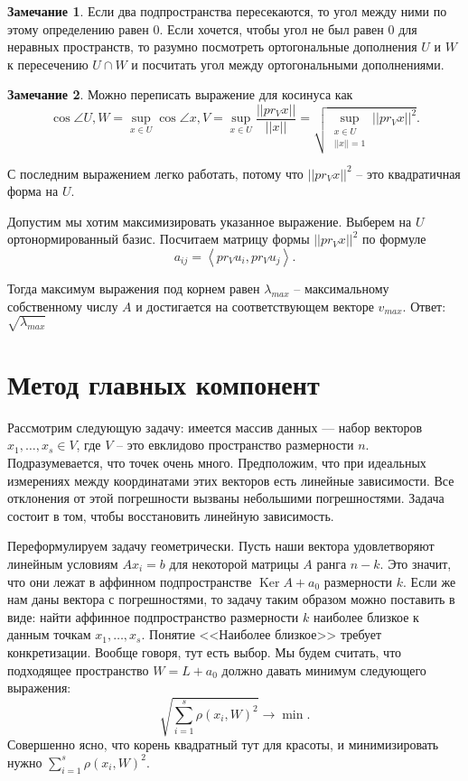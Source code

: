 \documentclass[10pt,a4paper,oneside]{book}
\theoremstyle{definition}
\newtheorem*{rem}{Замечание}
\DeclareMathOperator{\Ker}{Ker}
\def\lan{\left\langle }
\def\ran{\right\rangle}
\def\rm{\begin{rem}}
\def\erm{\end{rem}}
\begin{document}
\rm Если два подпространства пересекаются, то угол между ними по этому определению равен 0. Если хочется, чтобы угол не был равен 0 для неравных пространств, то разумно посмотреть ортогональные дополнения $U$ и $W$ к пересечению $U\cap W$ и посчитать угол между ортогональными дополнениями. 
\erm

\rm Можно переписать выражение для косинуса как $$\cos \angle U,W= \sup_{ x\in U} \cos \angle x, V = \sup_{x\in U} \frac{||pr_V x||}{||x||}= \sqrt{ \sup_{\substack{x\in U\\ ||x||=1}} ||pr_V x||^2} .$$
\erm

С последним выражением легко работать, потому что $||pr_V x||^2$ -- это квадратичная форма на $U$.

Допустим мы хотим максимизировать указанное выражение. Выберем на $U$ ортонормированный базис. Посчитаем матрицу формы $||pr_V x||^2$ по формуле 
$$a_{ij}= \lan pr_V u_i, pr_V u_j\ran.$$

Тогда максимум выражения под корнем равен $\lambda_{max}$ -- максимальному собственному числу $A$ и достигается на соответствующем векторе $v_{max}$. Ответ: $\sqrt{\lambda_{max}}$





\section*{Метод главных компонент}

Рассмотрим следующую задачу: имеется массив данных --- набор векторов $x_1,\dots,x_s \in V$, где $V$ -- это евклидово пространство размерности $n$. Подразумевается, что точек очень много. Предположим, что при идеальных измерениях между координатами этих векторов есть линейные зависимости. Все отклонения от этой погрешности вызваны небольшими погрешностями. Задача состоит в том, чтобы восстановить линейную зависимость. 


Переформулируем задачу геометрически. Пусть наши вектора удовлетворяют линейным условиям $Ax_i=b$ для некоторой матрицы $A$ ранга $n-k$. Это значит, что они лежат в аффинном подпространстве $\Ker A + a_0$ размерности $k$. Если же нам даны вектора с погрешностями, то задачу таким образом можно поставить в виде: найти аффинное подпространство размерности $k$ наиболее близкое к данным точкам $x_1,\dots,x_s$. Понятие <<Наиболее близкое>> требует конкретизации. Вообще говоря, тут есть выбор. Мы будем считать, что подходящее пространство $W=L+a_0$ должно давать минимум следующего выражения:
$$\sqrt{\sum_{i=1}^s \rho(x_i,W)^2} \to \min.$$
Совершенно ясно, что корень квадратный тут для красоты, и минимизировать нужно $\sum_{i=1}^s \rho(x_i,W)^2$.
\end{document}
